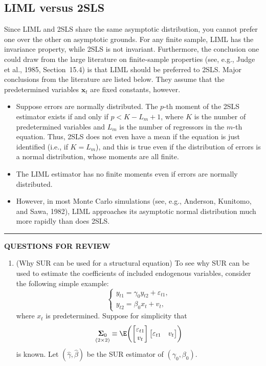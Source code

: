 \subsection*{LIML versus 2SLS}

Since LIML and 2SLS share the same asymptotic distribution, you cannot prefer
one over the other on asymptotic grounds. For any finite sample, LIML has the
invariance property, while 2SLS is not invariant. Furthermore, the conclusion one
could draw from the large literature on finite-sample properties (see, e.g., Judge
et al., 1985, Section~15.4) is that LIML should be preferred to 2SLS. Major conclusions from the literature are listed below. They assume that the predetermined
variables $\mathbf{x}_t$ are fixed constants, however.
\begin{itemize}
\item Suppose errors are normally distributed. The $p$-th moment of the 2SLS estimator exists if and only if $p < K - L_m + 1$, where $K$ is the number of predetermined
  variables and $L_m$ is the number of regressors in the $m$-th equation. Thus, 2SLS
  does not even have a mean if the equation is just identified (i.e., if $K = L_m$),
  and this is true even if the distribution of errors is a normal distribution, whose
  moments are all finite.

\item The LIML estimator has no finite moments even if errors are normally distributed.

\item However, in most Monte Carlo simulations (see, e.g., Anderson, Kunitomo, and
  Sawa, 1982), LIML approaches its asymptotic normal distribution much more
  rapidly than does 2SLS.
\end{itemize}

\bigskip
\noindent\rule{\textwidth}{0.4pt}
\textbf{QUESTIONS FOR REVIEW}
\medskip

\begin{enumerate}
\item (Why SUR can be used for a structural equation)\quad
  To see why SUR can be
  used to estimate the coefficients of included endogenous variables, consider
  the following simple example:
  \[
    \begin{cases}
      y_{t1} = \gamma_0 y_{t2} + \varepsilon_{t1}, \\
      y_{t2} = \beta_0 x_t + v_t,
    \end{cases}
  \]
  where $x_t$ is predetermined. Suppose for simplicity that
  \[
    \underset{(2 \times 2)}{\boldsymbol{\Sigma}_0}
    \equiv \E\!\left(\begin{bmatrix} \varepsilon_{t1} \\ v_t \end{bmatrix}
      \begin{bmatrix} \varepsilon_{t1} & v_t \end{bmatrix}\right)
  \]
  is known. Let $(\hat{\gamma}, \hat{\beta})$ be the SUR estimator of $(\gamma_0, \beta_0)$.
\end{enumerate}
